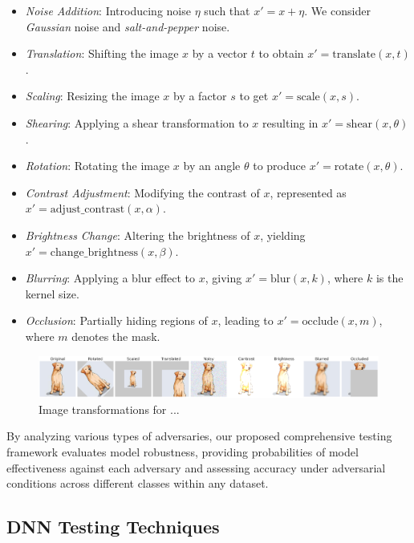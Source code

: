\begin{itemize}
    \item \emph{Noise Addition}: Introducing noise $\eta$ such that $x' = x + \eta$. We consider \emph{Gaussian} noise and \emph{salt-and-pepper} noise.
    \item \emph{Translation}: Shifting the image $x$ by a vector $t$ to obtain $x' = \text{translate}(x, t)$.
    \item \emph{Scaling}: Resizing the image $x$ by a factor $s$ to get $x' = \text{scale}(x, s)$.
    \item \emph{Shearing}: Applying a shear transformation to $x$ resulting in $x' = \text{shear}(x, \theta)$.
    \item \emph{Rotation}: Rotating the image $x$ by an angle $\theta$ to produce $x' = \text{rotate}(x, \theta)$.
    \item \emph{Contrast Adjustment}: Modifying the contrast of $x$, represented as $x' = \text{adjust\_contrast}(x, \alpha)$.
    \item \emph{Brightness Change}: Altering the brightness of $x$, yielding $x' = \text{change\_brightness}(x, \beta)$.
    \item \emph{Blurring}: Applying a blur effect to $x$, giving $x' = \text{blur}(x, k)$, where $k$ is the kernel size.
    \item \emph{Occlusion}: Partially hiding regions of $x$, leading to $x' = \text{occlude}(x, m)$, where $m$ denotes the mask.
\end{itemize}

\begin{figure}
    \centering
    \includegraphics[width=\linewidth]{figures/output_update.png}
    \caption{Image transformations for ...}
    \label{fig:image-trans}
\end{figure}

By analyzing various types of adversaries, our proposed comprehensive testing framework evaluates model robustness, providing probabilities of model effectiveness against each adversary and assessing accuracy under adversarial conditions across different classes within any dataset.

\subsection{DNN Testing Techniques}

